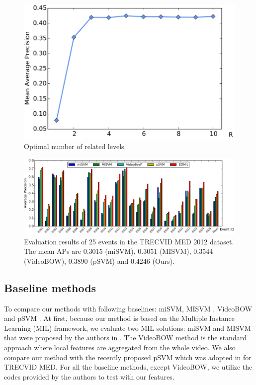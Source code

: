 \begin{figure}
	\centering
	\includegraphics[width=1\textwidth]{figure_3.pdf}
	\caption{Optimal number of related levels.}
	\label{figure_3}
\end{figure}


\begin{figure}
	\centering
	\includegraphics[width=1\textwidth]{figure_4.pdf}
	\caption{Evaluation results of 25 events in the TRECVID MED 2012 dataset. The mean APs are 0.3015 (miSVM), 0.3051 (MISVM), 0.3544 (VideoBOW), 0.3890 (pSVM) and 0.4246 (Ours).}
	\label{figure_4}
\end{figure}

\subsection{Baseline methods} To compare our methods with following baselines: miSVM, MISVM \cite{andrews2002support}, VideoBOW and pSVM \cite{lai2014video}. At first, because our method is based on the Multiple Instance Learning (MIL) framework, we evaluate two MIL solutions: miSVM and MISVM that were proposed by the authors in \cite{andrews2002support}. The VideoBOW method is the standard approach where local features are aggregated from the whole video. We also compare our method with the recently proposed pSVM which was adopted in \cite{lai2014video} for TRECVID MED. For all the baseline methods, except VideoBOW, we utilize the codes provided by the authors to test with our features.


